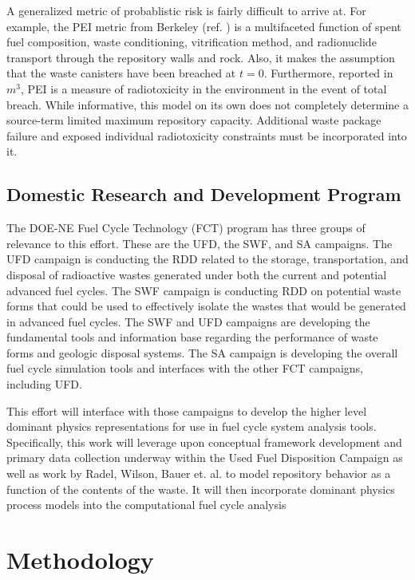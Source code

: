 A generalized metric of probablistic risk is fairly difficult to 
arrive at. For example, the \gls{PEI} metric from Berkeley 
(ref. \cite{bouvier_comparison_2007}) is a multifaceted 
function of spent fuel composition, waste conditioning, vitrification 
method, and radionuclide transport through the repository walls and 
rock.  Also, it makes the assumption that the waste canisters have 
been breached at $t=0$. Furthermore, reported in $m^3$, PEI is a 
measure of radiotoxicity in the environment in the event of total 
breach. While informative, this model on its own does not completely 
determine a source-term limited maximum repository capacity.  
Additional waste package failure and exposed individual radiotoxicity 
constraints must be incorporated into it.


\subsection{Domestic Research and Development Program}

The DOE-NE Fuel Cycle Technology (FCT) program has three groups of relevance to 
this effort.  These are the \gls{UFD}, the \gls{SWF}, and \gls{SA} 
campaigns.  The \gls{UFD} campaign is conducting the \gls{RDD} related to the 
storage, transportation, and disposal of radioactive wastes generated under both 
the current and potential advanced fuel cycles.  The SWF campaign is conducting 
\gls{RDD} on potential waste forms that could be used to effectively isolate 
the wastes that would be generated in advanced fuel cycles.  The \gls{SWF} and
\gls{UFD} campaigns are developing the fundamental tools and information base 
regarding the performance of waste forms and geologic disposal systems.  The 
\gls{SA} campaign is developing the overall fuel cycle simulation tools and 
interfaces with the other FCT campaigns, including \gls{UFD}.  

This effort will interface with those campaigns to develop the higher level
dominant physics representations for use in fuel cycle system analysis tools.
Specifically, this work will leverage upon conceptual framework development and
primary data collection underway within the Used Fuel Disposition Campaign as
well as work by Radel, Wilson, Bauer et. al. to model repository behavior as a
function of the contents of the waste.  It will then incorporate dominant
physics process models into the \Cyclus computational fuel cycle analysis




\section{Methodology} 


